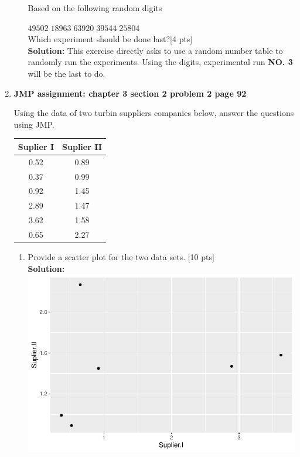 \documentclass[11pt]{article}\usepackage[]{graphicx}\usepackage[]{color}
\begin{document}
\begin{enumerate}
\begin{enumerate}
	\noindent Based on the following random digits
	
	\hspace{3.5cm}$49502 \; 18963 \; 63920 \; 39544 \; 25804$\\
	Which experiment should be done last?[4 pts]\\
	\textbf{Solution:} This exercise directly asks to use a random number table to randomly run the experiments. Using the digits, experimental run \textbf{NO. 3} will be the last to do. 
\end{enumerate}

\item \textbf{JMP assignment: chapter 3 section 2 problem 2 page 92}

Using the data of two turbin suppliers companies below, answer the questions using JMP.

\begin{center}
	\begin{tabular}{|cc|}	
		\hline
		Suplier I & Suplier II\\
		\hline
		0.52 & 0.89 \\
		0.37 & 0.99 \\ 
		0.92 & 1.45     \\
		2.89 & 1.47     \\
	    3.62 & 1.58     \\
	    0.65 & 2.27     \\
 
	\hline                 
	\end{tabular}
\end{center}
   \begin{enumerate}
         \item Provide a scatter plot  for the two data sets. [10 pts] \\
         \textbf{Solution:}
\includegraphics{stat305-hw3_s20_sol-004}


\end{enumerate}
\end{enumerate}
\end{document}
